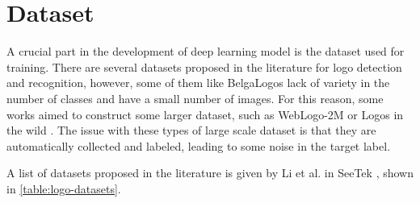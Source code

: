 \chapter{Dataset}
\label{chap:dataset}

A crucial part in the development of deep learning model is the dataset used for training. There are several datasets proposed in the literature for logo detection and recognition, however, some of them like BelgaLogos \cite{neumann2002integration} lack of variety in the number of classes and have a small number of images. For this reason, some works aimed to construct some larger dataset, such as WebLogo-2M \cite{su2017weblogo} or Logos in the wild \cite{tuzko2017open}. The issue with these types of large scale dataset is that they are automatically collected and labeled, leading to some noise in the target label.

A list of datasets proposed in the literature is given by Li et al. in SeeTek \cite{li2022seetek}, shown in \autoref{table:logo-datasets}.

